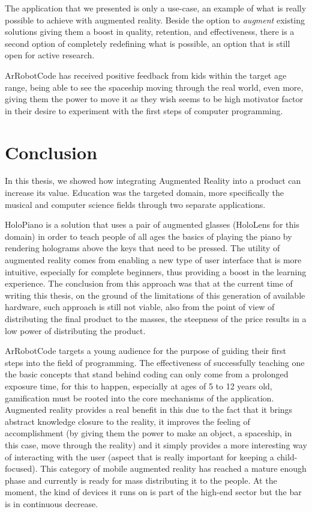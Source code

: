 \documentclass[12 pct]{report}
\begin{document}
The application that we presented is only a use-case, an example of what is really possible to achieve with augmented reality. Beside the option to \textit{augment} existing solutions giving them a boost in quality, retention, and effectiveness, there is a second option of completely redefining what is possible, an option that is still open for active research.

ArRobotCode has received positive feedback from kids within the target age range, being able to see the spaceship moving through the real world, even more, giving them the power to move it as they wish seems to be high motivator factor in their desire to experiment with the first steps of computer programming.


\chapter{Conclusion}
In this thesis, we showed how integrating Augmented Reality into a product can increase its value. Education was the targeted domain, more specifically the musical and computer science fields through two separate applications.

HoloPiano is a solution that uses a pair of augmented glasses (HoloLens for this domain) in order to teach people of all ages the basics of playing the piano by rendering holograms above the keys that need to be pressed. The utility of augmented reality comes from enabling a new type of user interface that is more intuitive, especially for complete beginners, thus providing a boost in the learning experience. The conclusion from this approach was that at the current time of writing this thesis, on the ground of the limitations of this generation of available hardware, such approach is still not viable, also from the point of view of distributing the final product to the masses, the steepness of the price results in a low power of distributing the product.

ArRobotCode targets a young audience for the purpose of guiding their first steps into the field of programming. The effectiveness of successfully teaching one the basic concepts that stand behind coding can only come from a prolonged exposure time, for this to happen, especially at ages of 5 to 12 years old, gamification must be rooted into the core mechanisms of the application. Augmented reality provides a real benefit in this due to the fact that it brings abstract knowledge closure to the reality, it improves the feeling of accomplishment (by giving them the power to make an object, a spaceship, in this case, move through the reality) and it simply provides a more interesting way of interacting with the user (aspect that is really important for keeping a child-focused). This category of mobile augmented reality has reached a mature enough phase and currently is ready for mass distributing it to the people. At the moment, the kind of devices it runs on is part of the high-end sector but the bar is in continuous decrease.
\end{document}
